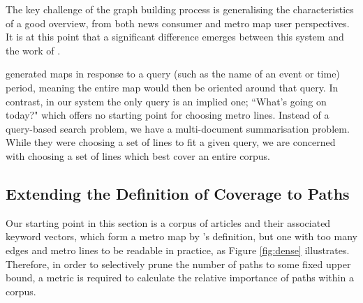 The key challenge of the graph building process is generalising the characteristics of a good overview, from both news consumer and metro map user perspectives. It is at this point that a significant difference emerges between this system and the work of \cite{MetroMapsOfScience, GeneratingInformationMaps, InformationCartographyPre}. 

\citeauthor{GeneratingInformationMaps} generated maps in response to a query (such as the name of an event or time) period, meaning the entire map would then be oriented around that query. In contrast, in our system the only query is an implied one; ``What's going on today?" which offers no starting point for choosing metro lines. Instead of a query-based search problem, we have a multi-document summarisation problem. While they were choosing a set of lines to fit a given query, we are concerned with choosing a set of lines which best cover an entire corpus.

\subsection{Extending the Definition of Coverage to Paths}\label{sec:linecoverage}

Our starting point in this section is a corpus of articles and their associated keyword vectors, which form a metro map by \citeauthor{GeneratingInformationMaps}'s definition, but one with too many edges and metro lines to be readable in practice, as Figure \ref{fig:dense} illustrates. Therefore, in order to selectively prune the number of paths to some fixed upper bound, a metric is required to calculate the relative importance of paths within a corpus.

